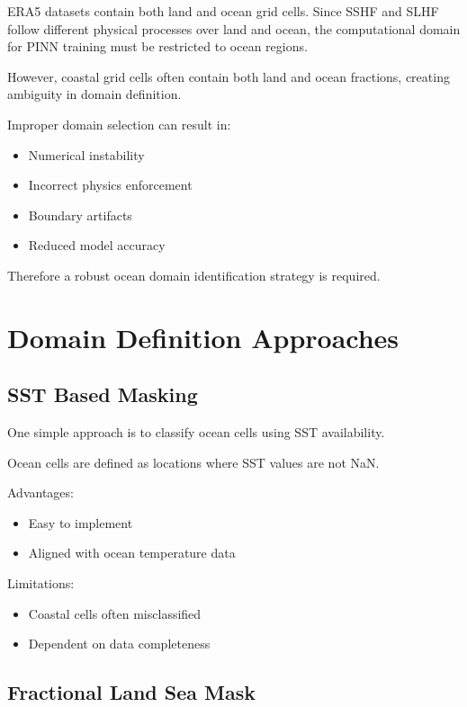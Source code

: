 \documentclass[12pt,a4paper]{article}
\begin{document}
ERA5 datasets contain both land and ocean grid cells. Since SSHF and SLHF follow different physical processes over land and ocean, the computational domain for PINN training must be restricted to ocean regions.

However, coastal grid cells often contain both land and ocean fractions, creating ambiguity in domain definition.

Improper domain selection can result in:

\begin{itemize}
\item Numerical instability
\item Incorrect physics enforcement
\item Boundary artifacts
\item Reduced model accuracy
\end{itemize}

Therefore a robust ocean domain identification strategy is required.

\section{Domain Definition Approaches}

\subsection{SST Based Masking}

One simple approach is to classify ocean cells using SST availability.

Ocean cells are defined as locations where SST values are not NaN.

Advantages:

\begin{itemize}
\item Easy to implement
\item Aligned with ocean temperature data
\end{itemize}

Limitations:

\begin{itemize}
\item Coastal cells often misclassified
\item Dependent on data completeness
\end{itemize}

\subsection{Fractional Land Sea Mask}
\end{document}
